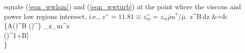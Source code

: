 %
equate (\ref{eqn_wwlam}) and (\ref{eqn_wwturb}) at the point where the viscous and power law regions intersect, i.e., $z^+ = 11.81
\equiv z_m^+ = z_m \bar{\rho}u^*/\bar{\mu}$.
%
%
z^B\,\mbox{d}z &=& \left\{A\left(\frac{\bar{\rho}}{\bar{\mu}}\right)^B
\left(\right)^{}\right\}  \left[z^{1+B}\right]_{z_m}^{\Delta z} \nonumber\\
\left(\right)^{1+B}\right] \nonumber\\
\right\}  \nonumber\\
